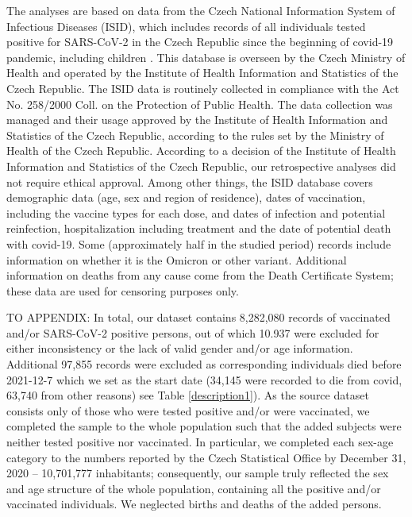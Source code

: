 \documentclass[preprint,12pt,authoryear]{elsarticle}
\begin{document}
The analyses are based on data from the Czech National Information System of Infectious Diseases (ISID), which includes records of all individuals tested positive for SARS-CoV-2 in the Czech Republic since the beginning of covid-19 pandemic, including children \citep{komenda2020}. This database is overseen by the Czech Ministry of Health and operated by the Institute of Health Information and Statistics of the Czech Republic. The ISID data is routinely collected in compliance with the Act No. 258/2000 Coll. on the Protection of Public Health. 
The data collection was managed and their usage approved by the Institute of Health Information and Statistics of the Czech Republic, according to the rules set by the Ministry of Health of the Czech Republic. According to a decision of the Institute of Health Information and Statistics of the Czech Republic, our retrospective analyses did not require ethical approval.
Among other things, the ISID database covers demographic data (age, sex and region of residence), dates of vaccination, including the vaccine types for each dose, and dates of infection and potential reinfection, hospitalization including treatment and the date of potential death with covid-19. Some (approximately half in the studied period) records include information on whether it is the Omicron or other variant. Additional information on deaths from any cause come from the Death Certificate System; these data are used for censoring purposes only.

{\color{blue} TO APPENDIX: In total, our dataset contains 8,282,080 records of vaccinated and/or SARS-CoV-2 positive persons, out of which 10.937 were excluded for either inconsistency or the lack of valid gender and/or age information. Additional 97,855 records were excluded as corresponding individuals died before 2021-12-7 which we set as the start date (34,145 were recorded to die from covid, 63,740 from other reasons) see Table \ref{description1}). 
As the source dataset consists only of those who were tested positive and/or were vaccinated, we completed the sample to the whole population such that the added subjects were neither tested positive nor vaccinated. In particular, we completed each sex-age category to the numbers reported by the Czech Statistical Office by December 31, 2020 -- 10,701,777 inhabitants; consequently, our sample truly reflected the sex and age structure of the whole population, containing all the positive and/or vaccinated individuals. We neglected births and deaths of the added persons.} 
\end{document}
